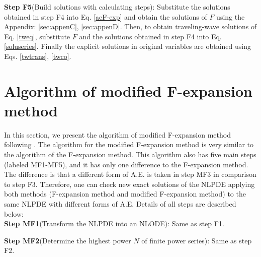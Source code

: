 \documentclass[prd,aps,floats,showkeys,nofootinbib,notitlepage]{revtex4-2}
\begin{document}
	\textbf{Step F5}(Build solutions with calculating steps): Substitute the solutions obtained in step F4 into Eq. \eqref{aeF-exp}  and obtain the solutions of $F$ using the Appendix: \ref{sec:appenC}, \ref{sec:appenD}. Then, to obtain traveling-wave solutions of Eq. \eqref{tweq}, substitute $F$ and the solutions obtained in step F4 into Eq. \eqref{soluseries}. Finally the explicit solutions in original variables are obtained using Eqs. \eqref{twtrans}, \eqref{twco}.\\
	

	
	
	\section{Algorithm of modified F-expansion method}\label{sec:mF}
	In this section, we present the algorithm of modified F-expansion method following \cite{modfexpn}.
	The algorithm for the modified F-expansion method \cite{modfexpn} is very similar to the algorithm of the F-expansion method. This algorithm also has five main steps (labeled MF1-MF5), and it has only one difference to the F-expansion method. The difference is that a different form of A.E. is taken in step MF3 in comparison to step F3. Therefore, one can check new exact solutions of the NLPDE applying both methods (F-expansion method and modified F-expansion method) to the same NLPDE with different forms of A.E. Details of all steps are described below:\\ 
	
	\textbf{Step MF1}(Transform the NLPDE into an NLODE): Same as step F1.
	
	\textbf{Step MF2}(Determine the highest power $N$ of finite power series):  Same as step F2.
	
\end{document}
